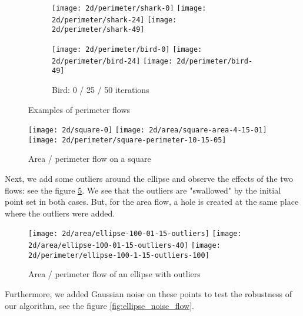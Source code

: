 \begin{figure}[h]
    \centering

    \begin{subfigure}[b]{\textwidth}
        \texttt{[image: 2d/perimeter/shark-0]}
        \texttt{[image: 2d/perimeter/shark-24]}
        \texttt{[image: 2d/perimeter/shark-49]}
        \label{fig:shark_perimeter_flow}
    \end{subfigure}

    \begin{subfigure}[b]{\textwidth}
        \texttt{[image: 2d/perimeter/bird-0]}
        \texttt{[image: 2d/perimeter/bird-24]}
        \texttt{[image: 2d/perimeter/bird-49]}
        \caption{Bird: 0 / 25 / 50 iterations}
        \label{fig:bird_perimeter_flow}
    \end{subfigure}

    \caption{Examples of perimeter flows}
\end{figure}

\begin{figure}[h]
    \centering
    \texttt{[image: 2d/square-0]}
    \texttt{[image: 2d/area/square-area-4-15-01]}
    \texttt{[image: 2d/perimeter/square-perimeter-10-15-05]}
    \caption{Area / perimeter flow on a square}
    \label{fig:area_perimeter_flow_square}
\end{figure}

Next, we add some outliers around the ellipse and observe the effects of the two
flows: see the figure \ref{fig:ellipse_outliers_flow}. We see that the outliers
are "swallowed" by the initial point set in both cases. But, for the area flow,
a hole is created at the same place where the outliers were added.

\begin{figure}[h]
    \centering

    \texttt{[image: 2d/area/ellipse-100-01-15-outliers]}
    \texttt{[image: 2d/area/ellipse-100-01-15-outliers-40]}
    \texttt{[image: 2d/perimeter/ellipse-100-1-15-outliers-100]}
    \caption{Area / perimeter flow of an ellipse with outliers}
    \label{fig:ellipse_outliers_flow}
\end{figure}

Furthermore, we added Gaussian noise on these points to test the robustness
of our algorithm, see the figure \ref{fig:ellipse_noise_flow}.

